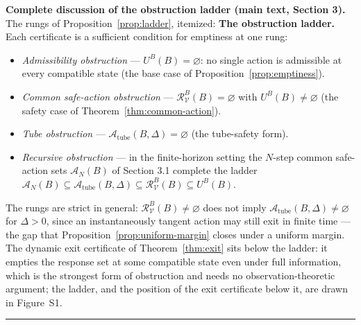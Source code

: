 \documentclass[11pt]{article}
\theoremstyle{definition}
\begin{document}
\bigskip
\noindent\textbf{Complete discussion of the obstruction ladder (main text, Section 3).}
The rungs of Proposition~\ref{prop:ladder}, itemized:
\textbf{The obstruction ladder.} Each certificate is a sufficient
condition for emptiness at one rung:
\begin{itemize}
\item \emph{Admissibility obstruction} --- \(U^B(B)=\varnothing\): no
single action is admissible at every compatible state (the base case of
Proposition~\ref{prop:emptiness}).
\item \emph{Common safe-action obstruction} ---
\(\mathcal{R}_{\mathcal{V}}^B(B)=\varnothing\) with
\(U^B(B)\neq\varnothing\) (the safety case of
Theorem~\ref{thm:common-action}).
\item \emph{Tube obstruction} ---
\(\mathcal{A}_{\mathrm{tube}}(B,\Delta)=\varnothing\) (the tube-safety
form).
\item \emph{Recursive obstruction} --- in the finite-horizon setting the
\(N\)-step common safe-action sets \(\mathcal{A}_N(B)\) of Section 3.1 complete the ladder
\(\mathcal{A}_N(B)\subseteq\mathcal{A}_{\mathrm{tube}}(B,\Delta)\subseteq\mathcal{R}_{\mathcal{V}}^B(B)\subseteq U^B(B)\).
\end{itemize}
The rungs are strict in general: \(\mathcal{R}_{\mathcal{V}}^B(B)\neq\varnothing\)
does not imply \(\mathcal{A}_{\mathrm{tube}}(B,\Delta)\neq\varnothing\)
for \(\Delta>0\), since an instantaneously tangent action may still exit
in finite time --- the gap that Proposition~\ref{prop:uniform-margin}
closes under a uniform margin. The dynamic exit certificate of
Theorem~\ref{thm:exit} sits below the ladder: it empties the response
set at some compatible state even under full information, which is the
strongest form of obstruction and needs no observation-theoretic
argument; the ladder, and the position of the exit certificate below it, are drawn in Figure~S1.
\rule{0.5\linewidth}{0.5pt}
\end{document}
